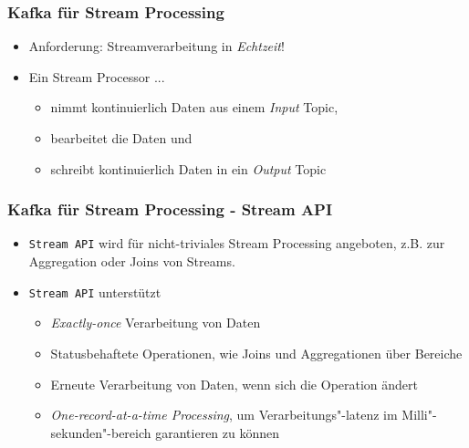 \begin{frame}
\frametitle{Kafka für Stream Processing}

\begin{itemize}
	\item Anforderung: Streamverarbeitung in \textit{Echtzeit}!
	\item Ein Stream Processor ...
	\begin{itemize}
		\item nimmt kontinuierlich Daten aus einem \textit{Input} Topic,   %
		\item bearbeitet die Daten und %
		\item schreibt kontinuierlich Daten in ein \textit{Output} Topic %
	\end{itemize}
\end{itemize}

\end{frame}


\begin{frame}
\frametitle{Kafka für Stream Processing - Stream API}

\begin{itemize}
	\item \texttt{Stream API} wird für nicht-triviales Stream Processing angeboten,
	z.B. zur Aggregation oder Joins von Streams. 
	\item \texttt{Stream API} unterstützt
	\begin{itemize}
		\item \textit{Exactly-once} Verarbeitung von Daten
		\item Statusbehaftete Operationen, wie Joins und Aggregationen über Bereiche
		\item Erneute Verarbeitung von Daten, wenn sich die Operation ändert
		\item \textit{One-record-at-a-time Processing}, um Verarbeitungs"-latenz im Milli"-sekunden"-bereich garantieren zu können
	\end{itemize}
\end{itemize}

\end{frame}

